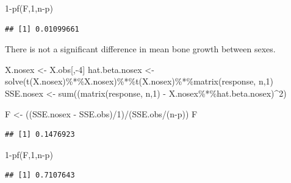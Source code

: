 \documentclass[
]{book}
\newenvironment{Shaded}{\begin{snugshade}}{\end{snugshade}}
\newcommand{\DecValTok}[1]{\textcolor[rgb]{0.00,0.00,0.81}{#1}}
\newcommand{\FunctionTok}[1]{\textcolor[rgb]{0.00,0.00,0.00}{#1}}
\newcommand{\NormalTok}[1]{#1}
\newcommand{\OtherTok}[1]{\textcolor[rgb]{0.56,0.35,0.01}{#1}}
\newcommand{\SpecialCharTok}[1]{\textcolor[rgb]{0.00,0.00,0.00}{#1}}
\begin{document}
\begin{Shaded}
\begin{Highlighting}[]
\DecValTok{1}\SpecialCharTok{{-}}\FunctionTok{pf}\NormalTok{(F,}\DecValTok{1}\NormalTok{,n}\SpecialCharTok{{-}}\NormalTok{p)}
\end{Highlighting}
\end{Shaded}

\begin{verbatim}
## [1] 0.01099661
\end{verbatim}

There is not a significant difference in mean bone growth between sexes.

\begin{Shaded}
\begin{Highlighting}[]
\NormalTok{X.nosex }\OtherTok{\textless{}{-}}\NormalTok{ X.obs[,}\SpecialCharTok{{-}}\DecValTok{4}\NormalTok{]}
\NormalTok{hat.beta.nosex }\OtherTok{\textless{}{-}} \FunctionTok{solve}\NormalTok{(}\FunctionTok{t}\NormalTok{(X.nosex)}\SpecialCharTok{\%*\%}\NormalTok{X.nosex)}\SpecialCharTok{\%*\%}\FunctionTok{t}\NormalTok{(X.nosex)}\SpecialCharTok{\%*\%}\FunctionTok{matrix}\NormalTok{(response, n,}\DecValTok{1}\NormalTok{)}
\NormalTok{SSE.nosex }\OtherTok{\textless{}{-}} \FunctionTok{sum}\NormalTok{((}\FunctionTok{matrix}\NormalTok{(response, n,}\DecValTok{1}\NormalTok{) }\SpecialCharTok{{-}}\NormalTok{ X.nosex}\SpecialCharTok{\%*\%}\NormalTok{hat.beta.nosex)}\SpecialCharTok{\^{}}\DecValTok{2}\NormalTok{)}

\NormalTok{F }\OtherTok{\textless{}{-}}\NormalTok{ ((SSE.nosex }\SpecialCharTok{{-}}\NormalTok{ SSE.obs)}\SpecialCharTok{/}\DecValTok{1}\NormalTok{)}\SpecialCharTok{/}\NormalTok{(SSE.obs}\SpecialCharTok{/}\NormalTok{(n}\SpecialCharTok{{-}}\NormalTok{p))}
\NormalTok{F}
\end{Highlighting}
\end{Shaded}

\begin{verbatim}
## [1] 0.1476923
\end{verbatim}

\begin{Shaded}
\begin{Highlighting}[]
\DecValTok{1}\SpecialCharTok{{-}}\FunctionTok{pf}\NormalTok{(F,}\DecValTok{1}\NormalTok{,n}\SpecialCharTok{{-}}\NormalTok{p)}
\end{Highlighting}
\end{Shaded}

\begin{verbatim}
## [1] 0.7107643
\end{verbatim}
\end{document}

